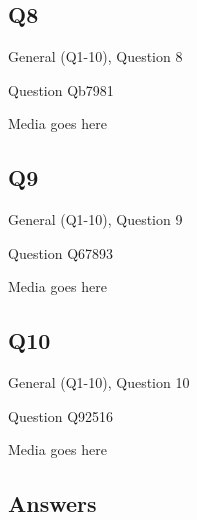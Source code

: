 \documentclass[11pt]{beamer}
\begin{document}
\subsection*{Q8}
\begin{frame}[t]{General (Q1-10), Question 8}
\vspace{2em}
\begin{block}{Question}
Qb7981
\end{block}
\begin{center}
Media goes here
\end{center}
\end{frame}
    

\subsection*{Q9}
\begin{frame}[t]{General (Q1-10), Question 9}
\vspace{2em}
\begin{block}{Question}
Q67893
\end{block}
\begin{center}
Media goes here
\end{center}
\end{frame}
    

\subsection*{Q10}
\begin{frame}[t]{General (Q1-10), Question 10}
\vspace{2em}
\begin{block}{Question}
Q92516
\end{block}
\begin{center}
Media goes here
\end{center}
\end{frame}
    
\subsection{Answers}
\end{document}
